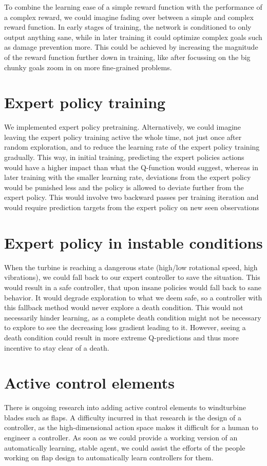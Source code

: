 \documentclass[hyperref,beleg]{cgvpub}
\begin{document}
To combine the learning ease of a simple reward function with the performance of a complex reward, we could imagine fading over between a simple and complex reward function. In early stages of training, the network is conditioned to only output anything sane, while in later training it could optimize complex goals such as damage prevention more. This could be achieved by increasing the magnitude of the reward function further down in training, like after focussing on the big chunky goals zoom in on more fine-grained problems.


\section{Expert policy training}

We implemented expert policy pretraining. Alternatively, we could imagine leaving the expert policy training active the whole time, not just once after random exploration, and to reduce the learning rate of the expert policy training gradually. This way, in initial training, predicting the expert policies actions would have a higher impact than what the Q-function would suggest, whereas in later training with the smaller learning rate, deviations from the expert policy would be punished less and the policy is allowed to deviate further from the expert policy. This would involve two backward passes per training iteration and would require prediction targets from the expert policy on new seen observations

\section{Expert policy in instable conditions}
When the turbine is reaching a dangerous state (high/low rotational speed, high vibrations), we could fall back to our expert controller to save the situation. This would result in a safe controller, that upon insane policies would fall back to sane behavior. It would degrade exploration to what we deem safe, so a controller with this fallback method would never explore a death condition. This would not necessarily hinder learning, as a complete death condition might not be necessary to explore to see the decreasing loss gradient leading to it. However, seeing a death condition could result in more extreme Q-predictions and thus more incentive to stay clear of a death.

\section{Active control elements}
There is ongoing research into adding active control elements to windturbine blades such as flaps. A difficulty incurred in that research is the design of a controller, as the high-dimensional action space makes it difficult for a human to engineer a controller. As soon as we could provide a working version of an automatically learning, stable agent, we could assist the efforts of the people working on flap design to automatically learn controllers for them.
\end{document}
